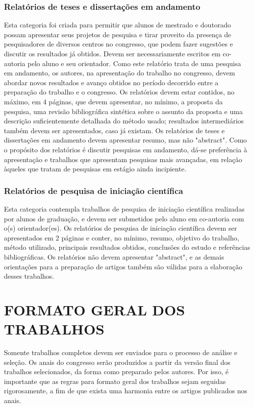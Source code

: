 \documentclass{anpet}
\begin{document}
\subsubsection{Relatórios de teses e dissertações em andamento}
Esta categoria foi criada para permitir que alunos de mestrado e doutorado possam apresentar seus projetos de pesquisa e tirar proveito da presença de pesquisadores de diversos centros no congresso, que podem fazer sugestões e discutir os resultados já obtidos. Devem ser necessariamente escritos em co-autoria pelo aluno e seu orientador. Como este relatório trata de uma pesquisa em andamento, os autores, na apresentação do trabalho no congresso, devem abordar novos resultados e avanço obtidos no período decorrido entre a preparação do trabalho e o congresso. Os relatórios devem estar contidos, no máximo, em 4 páginas, que devem apresentar, no mínimo, a proposta da pesquisa, uma revisão bibliográfica sintética sobre o assunto da proposta e uma descrição suficientemente detalhada do método usado; resultados intermediários também devem ser apresentados, caso já existam. Os relatórios de teses e dissertações em andamento devem apresentar resumo, mas não "abstract". Como o propósito dos relatórios é discutir pesquisas em andamento, dá-se preferência à apresentação e trabalhos que apresentam pesquisas mais avançadas, em relação àqueles que tratam de pesquisas em estágio ainda incipiente.

\subsubsection{Relatórios de pesquisa de iniciação científica}
Esta categoria contempla trabalhos de pesquisa de iniciação científica realizadas por alunos de graduação, e devem ser submetidos pelo aluno em co-autoria com o(s) orientador(es). Os relatórios de pesquisa de iniciação científica devem ser apresentados em 2 páginas e conter, no mínimo, resumo, objetivo do trabalho, método utilizado, principais resultados obtidos, conclusões do estudo e referências bibliográficas. Os relatórios não devem apresentar "abstract", e as demais orientações para a preparação de artigos também são válidas para a elaboração desses trabalhos.

\section{FORMATO GERAL DOS TRABALHOS}
Somente trabalhos completos devem ser enviados para o processo de análise e seleção. Os anais do congresso serão produzidos a partir da versão final dos trabalhos selecionados, da forma como preparado pelos autores. Por isso, é importante que as regras para formato geral dos trabalhos sejam seguidas rigorosamente, a fim de que exista uma harmonia entre os artigos publicados nos anais.
\end{document}
